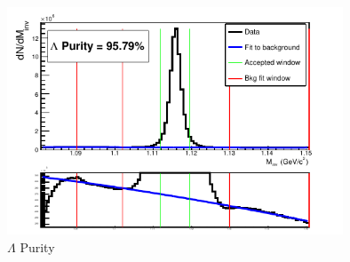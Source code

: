 \documentclass[../AnalysisNoteJBuxton.tex]{subfiles}
\begin{document}
\begin{figure}[h]
  \centering
  \includegraphics[width=100mm]{3_DataSelection/Figures/LamPurity_LamK0.pdf}
  \caption[$\Lambda$ Purity]{$\Lambda$ Purity}
  \label{fig:LamPurity}
\end{figure}
\end{document}
